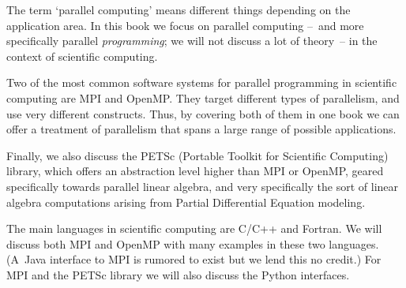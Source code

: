 
The term `parallel computing' means different things
depending on the application area. In this book we focus
on parallel computing
--~and more specifically parallel \emph{programming};
we will not discuss a lot of theory~--
in the context of scientific computing.

Two of the most common software systems for parallel programming
in scientific computing are MPI and OpenMP.
They target different types of parallelism,
and use very different constructs. 
Thus, by covering both of them in one book
we can offer a treatment of parallelism that
spans a large range of possible applications.

Finally, we also discuss the PETSc
(Portable Toolkit for Scientific Computing)
library, which offers an abstraction level higher than
MPI or OpenMP, geared specifically towards
parallel linear algebra,
and very specifically the sort of linear algebra
computations arising from Partial Differential Equation modeling.

The main languages in scientific computing are C/C++ and Fortran.
We will discuss both MPI and OpenMP with many examples in these two languages.
(A~Java interface to MPI is rumored to exist but we lend this no credit.)
For MPI and the PETSc library we will also discuss the Python interfaces.
